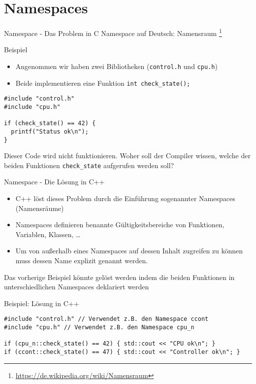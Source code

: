 \documentclass[presentation]{beamer}
\begin{document}
\section{Namespaces}
\label{sec:org05619e5}
\begin{frame}[label={sec:orgaf31c03},fragile]{Namespace - Das Problem in C}
 Namespace auf Deutsch:
\alert{Namensraum} \footnote{\href{https://de.wikipedia.org/wiki/Namensraum}{https://de.wikipedia.org/wiki/Namensraum}}
\begin{block}{Beispiel}
\begin{itemize}
\item Angenommen wir haben zwei Bibliotheken ({\color{solarizedYellow}\verb!control.h!} und {\color{solarizedYellow}\verb!cpu.h!})
\item Beide implementieren eine Funktion {\color{solarizedYellow}\verb!int check_state();!}
\end{itemize}
\begin{verbatim}
#include "control.h"
#include "cpu.h"

if (check_state() == 42) {
  printf("Status ok\n");
}
\end{verbatim}
\end{block}
Dieser Code wird \alert{nicht funktionieren}. Woher soll der Compiler
wissen, welche der beiden Funktionen {\color{solarizedYellow}\verb!check_state!} aufgerufen werden
soll?
\end{frame}
\begin{frame}[label={sec:orgf15748f},fragile]{Namespace - Die Lösung in C++}
 \begin{itemize}
\item C++ löst dieses Problem durch die Einführung sogenannter \alert{Namespaces}
(\alert{Namensräume})
\item Namespaces definieren \alert{benannte Gültigkeitsbereiche} von Funktionen,
Variablen, Klassen, \ldots{}
\item Um von außerhalb eines Namespaces auf dessen Inhalt zugreifen zu
können muss dessen \alert{Name explizit genannt} werden.
\end{itemize}
Das vorherige Beispiel könnte gelöst werden indem die beiden
Funktionen in unterschiedlichen Namespaces deklariert werden
\begin{exampleblock}{Beispiel: Lösung in C++}
\begin{verbatim}
#include "control.h" // Verwendet z.B. den Namespace ccont 
#include "cpu.h" // Verwendet z.B. den Namespace cpu_n

if (cpu_n::check_state() == 42) { std::cout << "CPU ok\n"; }
if (ccont::check_state() == 47) { std::cout << "Controller ok\n"; }
\end{verbatim}
\end{exampleblock}
\end{frame}
\end{document}
